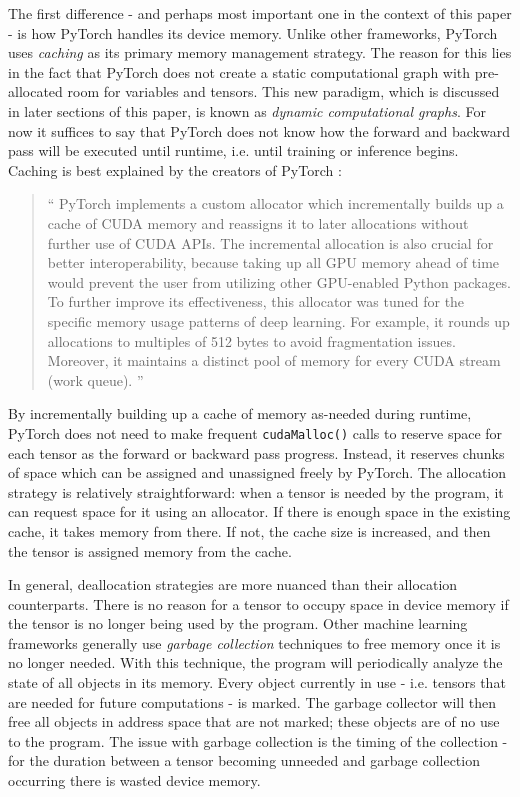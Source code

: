 \documentclass[12pt,letterpaper]{article}
\begin{document}
\label{sec:memory_caching}
The first difference - and perhaps most important one in the context of this paper - is how PyTorch handles its device memory. Unlike other frameworks, PyTorch uses \textit{caching} as its primary memory management strategy. The reason for this lies in the fact that PyTorch does not create a static computational graph with pre-allocated room for variables and tensors. This new paradigm, which is discussed in later sections of this paper, is known as \textit{dynamic computational graphs}. For now it suffices to say that PyTorch does not know how the forward and backward pass will be executed until runtime, i.e. until training or inference begins. Caching is best explained by the creators of PyTorch \cite{pytorch_paper}:

\begin{quote}
\enquote{
PyTorch implements a custom allocator which incrementally builds up a cache of CUDA memory and reassigns it to later allocations without further use of CUDA APIs. The incremental allocation is also crucial for better interoperability, because taking up all GPU memory ahead of time would prevent the user from utilizing other GPU-enabled Python packages. To further improve its effectiveness, this allocator was tuned for the specific memory usage patterns of deep learning. For example, it rounds up allocations to multiples of 512 bytes to avoid fragmentation issues. Moreover, it maintains a distinct pool of memory for every CUDA stream (work queue).
}
\end{quote}

By incrementally building up a cache of memory as-needed during runtime, PyTorch does not need to make frequent \texttt{cudaMalloc()} calls to reserve space for each tensor as the forward or backward pass progress. Instead, it reserves chunks of space which can be assigned and unassigned freely by PyTorch. The allocation strategy is relatively straightforward: when a tensor is needed by the program, it can request space for it using an allocator. If there is enough space in the existing cache, it takes memory from there. If not, the cache size is increased, and then the tensor is assigned memory from the cache.
\par 

In general, deallocation strategies are more nuanced than their allocation counterparts. There is no reason for a tensor to occupy space in device memory if the tensor is no longer being used by the program. Other machine learning frameworks generally use \textit{garbage collection} techniques to free memory once it is no longer needed. With this technique, the program will periodically analyze the state of all objects in its memory. Every object currently in use - i.e. tensors that are needed for future computations - is marked. The garbage collector will then free all objects in address space that are not marked; these objects are of no use to the program. The issue with garbage collection is the timing of the collection - for the duration between a tensor becoming unneeded and garbage collection occurring there is wasted device memory.
\par 
\end{document}
